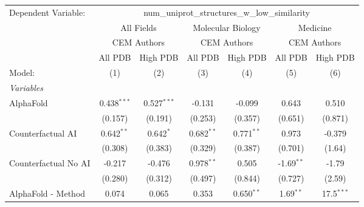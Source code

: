 \begingroup
\centering
\begin{tabular}{lcccccc}
   \tabularnewline \midrule \midrule
   Dependent Variable: & \multicolumn{6}{c}{num\_uniprot\_structures\_w\_low\_similarity}\\
 & \multicolumn{2}{c}{All Fields} & \multicolumn{2}{c}{Molecular Biology} & \multicolumn{2}{c}{Medicine} \\
\cmidrule(lr){2-3} \cmidrule(lr){4-5} \cmidrule(lr){6-7}
 & \multicolumn{2}{c}{CEM Authors} & \multicolumn{2}{c}{CEM Authors} & \multicolumn{2}{c}{CEM Authors} \\
\cmidrule(lr){2-3} \cmidrule(lr){4-5} \cmidrule(lr){6-7}
 & \multicolumn{1}{c}{All PDB} & \multicolumn{1}{c}{High PDB} & \multicolumn{1}{c}{All PDB} & \multicolumn{1}{c}{High PDB} & \multicolumn{1}{c}{All PDB} & \multicolumn{1}{c}{High PDB} \\
\cmidrule(lr){2-2} \cmidrule(lr){3-3} \cmidrule(lr){4-4} \cmidrule(lr){5-5} \cmidrule(lr){6-6} \cmidrule(lr){7-7}
   Model:                                                     & (1)           & (2)           & (3)          & (4)           & (5)           & (6)\\  
   \midrule
   \emph{Variables}\\
   AlphaFold                                                  & 0.438$^{***}$ & 0.527$^{***}$ & -0.131       & -0.099        & 0.643         & 0.510\\   
                                                              & (0.157)       & (0.191)       & (0.253)      & (0.357)       & (0.651)       & (0.871)\\   
   Counterfactual AI                                          & 0.642$^{**}$  & 0.642$^{*}$   & 0.682$^{**}$ & 0.771$^{**}$  & 0.973         & -0.379\\   
                                                              & (0.308)       & (0.383)       & (0.329)      & (0.387)       & (0.701)       & (1.64)\\   
   Counterfactual No AI                                       & -0.217        & -0.476        & 0.978$^{**}$ & 0.505         & -1.69$^{**}$  & -1.79\\   
                                                              & (0.280)       & (0.312)       & (0.497)      & (0.844)       & (0.727)       & (2.59)\\   
   AlphaFold - Method                                         & 0.074         & 0.065         & 0.353        & 0.650$^{**}$  & 1.69$^{**}$   & 17.5$^{***}$\\   

\end{tabular}
